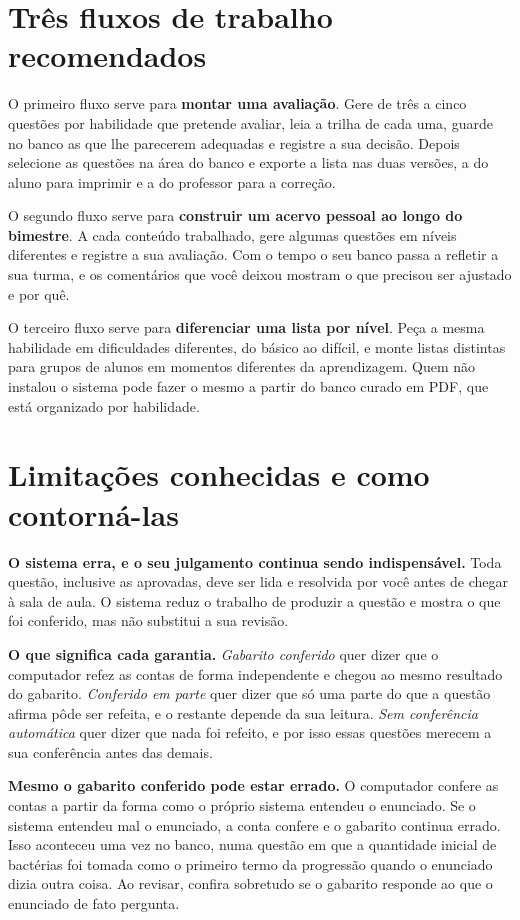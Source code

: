 \section*{Três fluxos de trabalho recomendados}

O primeiro fluxo serve para \textbf{montar uma avaliação}. Gere de três a cinco questões por
habilidade que pretende avaliar, leia a trilha de cada uma, guarde no banco as que lhe parecerem
adequadas e registre a sua decisão. Depois selecione as questões na área do banco e exporte a lista
nas duas versões, a do aluno para imprimir e a do professor para a correção.

O segundo fluxo serve para \textbf{construir um acervo pessoal ao longo do bimestre}. A cada
conteúdo trabalhado, gere algumas questões em níveis diferentes e registre a sua avaliação. Com o
tempo o seu banco passa a refletir a sua turma, e os comentários que você deixou mostram o que
precisou ser ajustado e por quê.

O terceiro fluxo serve para \textbf{diferenciar uma lista por nível}. Peça a mesma habilidade em
dificuldades diferentes, do básico ao difícil, e monte listas distintas para grupos de alunos em
momentos diferentes da aprendizagem. Quem não instalou o sistema pode fazer o mesmo a partir do
banco curado em PDF, que está organizado por habilidade.

\section*{Limitações conhecidas e como contorná-las}

\textbf{O sistema erra, e o seu julgamento continua sendo indispensável.} Toda questão, inclusive
as aprovadas, deve ser lida e resolvida por você antes de chegar à sala de aula. O sistema reduz o
trabalho de produzir a questão e mostra o que foi conferido, mas não substitui a sua revisão.

\textbf{O que significa cada garantia.} \emph{Gabarito conferido} quer dizer que o computador
refez as contas de forma independente e chegou ao mesmo resultado do gabarito. \emph{Conferido em
parte} quer dizer que só uma parte do que a questão afirma pôde ser refeita, e o restante depende da
sua leitura. \emph{Sem conferência automática} quer dizer que nada foi refeito, e por isso essas
questões merecem a sua conferência antes das demais.

\textbf{Mesmo o gabarito conferido pode estar errado.} O computador confere as contas a partir da
forma como o próprio sistema entendeu o enunciado. Se o sistema entendeu mal o enunciado, a conta
confere e o gabarito continua errado. Isso aconteceu uma vez no banco, numa questão em que a
quantidade inicial de bactérias foi tomada como o primeiro termo da progressão quando o enunciado
dizia outra coisa. Ao revisar, confira sobretudo se o gabarito responde ao que o enunciado de fato
pergunta.

